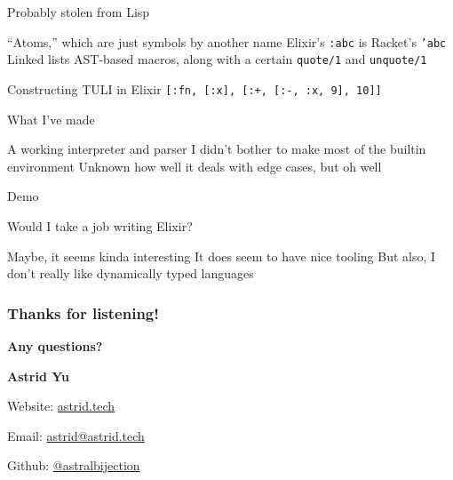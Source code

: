 \documentclass{beamer}
\begin{document}
\begin{frame}{Probably stolen from Lisp}
    \begin{outline}
        \1 ``Atoms,'' which are just symbols by another name
            \2 Elixir's \texttt{:abc} is Racket's \texttt{'abc}
        \1 Linked lists
        \1 AST-based macros, along with a certain \texttt{quote/1} and \texttt{unquote/1}
    \end{outline}
\end{frame}

\begin{frame}{Constructing TULI in Elixir}
    \texttt{[:fn, [:x], [:+, [:-, :x, 9], 10]]}
\end{frame}

\begin{frame}{What I've made}
    \begin{outline}
        \1 A working interpreter and parser
        \1 I didn't bother to make most of the builtin environment
        \1 Unknown how well it deals with edge cases, but oh well
    \end{outline}
\end{frame}

\begin{frame}
    \Huge
    \centering
    Demo
\end{frame}

\begin{frame}{Would I take a job writing Elixir?}
    \begin{outline}
        \1 Maybe, it seems kinda interesting
        \1 It does seem to have nice tooling
        \1 But also, I don't really like dynamically typed languages
    \end{outline}
\end{frame}

\begin{frame}
    \frametitle{Thanks for listening!}
    
    {\Huge \textbf{Any questions?}}

    \vspace{1cm}

    {\large \textbf{Astrid Yu}}

    Website: \href{https://astrid.tech}{astrid.tech}

    Email: \href{mailto:astrid@astrid.tech}{astrid@astrid.tech}
    
    Github: \href{https://github.com/astralbijection}{@astralbijection}
\end{frame}
\end{document}
